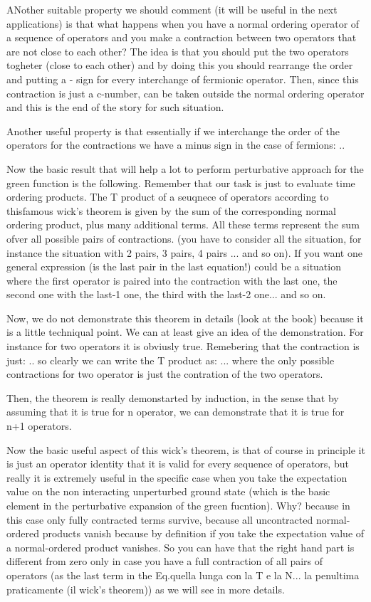 \documentclass[../main/main.tex]{subfiles}
\begin{document}
ANother suitable property we should comment (it will be useful in the next applications) is that what happens when you have a normal ordering operator of a sequence of operators and you make a contraction between two operators that are not close to each other?
The idea is that you should put the two operators togheter (close to each other) and by doing this you should rearrange the order and putting a - sign for every interchange of fermionic operator. Then, since this contraction is just a c-number, can be taken outside the normal ordering operator and this is the end of the story for such situation.


Another useful property is that essentially if we interchange the order of the operators for the contractions we have a minus sign in the case of fermions:
..

Now the basic result that will help a lot to perform perturbative approach for the green function is the following. Remember that our task is just to evaluate time ordering products. The T product of a seuqnece of operators according to thisfamous wick's theorem is given by the sum of the corresponding normal ordering product, plus many additional terms. All these terms represent the sum ofver all possible pairs of contractions.
(you have to consider all the situation, for instance the situation with 2 pairs, 3 pairs, 4 pairs ... and so on).
If you want one general expression (is the last pair in the last equation!) could be a situation where the first operator is paired into the contraction with the last one, the second one with the last-1 one, the third with the last-2 one... and so on.

Now, we do not demonstrate this theorem in details (look at the book) because it is a little techniqual point. We can at least give an idea of the demonstration.
For instance for two operators it is obviusly true. Remebering that the contraction is just:
..
so clearly we can write the T product as:
...
where the only possible contractions for two operator is just the contration of the two operators.

Then, the theorem is really demonstarted by induction, in the sense that by assuming that it is true for n operator, we can demonstrate that it is true for n+1 operators.


Now the basic useful aspect of this wick's theorem, is that of course in principle it is just an operator identity that it is valid for every sequence of operators, but really it is extremely useful in the specific case when you take the expectation value on the non interacting unperturbed ground state (which is the basic element in the perturbative expansion of the green fucntion).
Why? because in this case only fully contracted terms survive, because all uncontracted normal-ordered products vanish because by definition if you take the expectation value of a normal-ordered product vanishes.
So you can have that the right hand part is different from zero only in case you have a full contraction of all pairs of operators (as the last term in the Eq.quella lunga con la T e la N... la penultima praticamente (il wick's theorem)) as we will see in more details.
\end{document}
